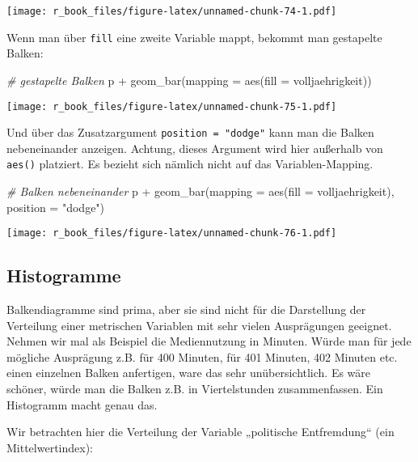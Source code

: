 \documentclass[
]{book}
\newenvironment{Shaded}{\begin{snugshade}}{\end{snugshade}}
\newcommand{\AttributeTok}[1]{\textcolor[rgb]{0.77,0.63,0.00}{#1}}
\newcommand{\CommentTok}[1]{\textcolor[rgb]{0.56,0.35,0.01}{\textit{#1}}}
\newcommand{\FunctionTok}[1]{\textcolor[rgb]{0.00,0.00,0.00}{#1}}
\newcommand{\NormalTok}[1]{#1}
\newcommand{\SpecialCharTok}[1]{\textcolor[rgb]{0.00,0.00,0.00}{#1}}
\newcommand{\StringTok}[1]{\textcolor[rgb]{0.31,0.60,0.02}{#1}}
\begin{document}
\texttt{[image: r\_book\_files/figure-latex/unnamed-chunk-74-1.pdf]}

Wenn man über \texttt{fill} eine zweite Variable mappt, bekommt man gestapelte Balken:

\begin{Shaded}
\begin{Highlighting}[]
\CommentTok{\# gestapelte Balken}
\NormalTok{p }\SpecialCharTok{+} \FunctionTok{geom\_bar}\NormalTok{(}\AttributeTok{mapping =} \FunctionTok{aes}\NormalTok{(}\AttributeTok{fill =}\NormalTok{ volljaehrigkeit)) }
\end{Highlighting}
\end{Shaded}

\texttt{[image: r\_book\_files/figure-latex/unnamed-chunk-75-1.pdf]}

Und über das Zusatzargument \texttt{position\ =\ "dodge"} kann man die Balken nebeneinander anzeigen. Achtung, dieses Argument wird hier außerhalb von \texttt{aes()} platziert. Es bezieht sich nämlich nicht auf das Variablen-Mapping.

\begin{Shaded}
\begin{Highlighting}[]
\CommentTok{\# Balken nebeneinander}
\NormalTok{p }\SpecialCharTok{+} \FunctionTok{geom\_bar}\NormalTok{(}\AttributeTok{mapping =} \FunctionTok{aes}\NormalTok{(}\AttributeTok{fill =}\NormalTok{ volljaehrigkeit), }\AttributeTok{position =} \StringTok{"dodge"}\NormalTok{) }
\end{Highlighting}
\end{Shaded}

\texttt{[image: r\_book\_files/figure-latex/unnamed-chunk-76-1.pdf]}

\hypertarget{histogramme}{%
\subsection{Histogramme}\label{histogramme}}

Balkendiagramme sind prima, aber sie sind nicht für die Darstellung der Verteilung einer metrischen Variablen mit sehr vielen Ausprägungen geeignet. Nehmen wir mal als Beispiel die Mediennutzung in Minuten. Würde man für jede mögliche Ausprägung z.B. für 400 Minuten, für 401 Minuten, 402 Minuten etc. einen einzelnen Balken anfertigen, ware das sehr unübersichtlich. Es wäre schöner, würde man die Balken z.B. in Viertelstunden zusammenfassen. Ein Histogramm macht genau das.

Wir betrachten hier die Verteilung der Variable „politische Entfremdung`` (ein Mittelwertindex):
\end{document}
